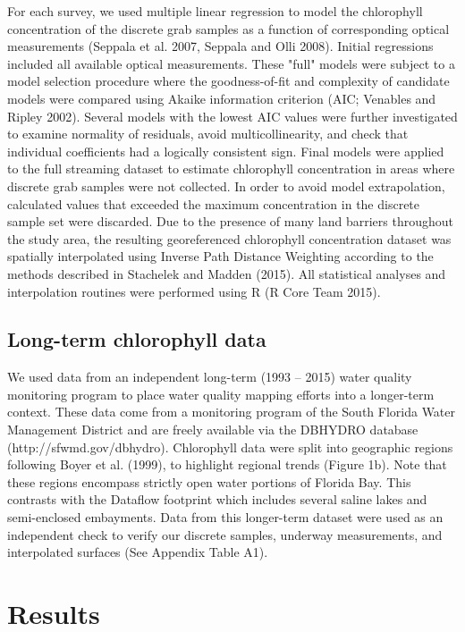 For each survey, we used multiple linear regression to model the chlorophyll concentration of the discrete grab samples as a function of corresponding optical measurements (Seppala et al. 2007, Seppala and Olli 2008). Initial regressions included all available optical measurements. These "full" models were subject to a model selection procedure where the goodness-of-fit and complexity of candidate models were compared using Akaike information criterion (AIC; Venables and Ripley 2002). Several models with the lowest AIC values were further investigated to examine normality of residuals, avoid multicollinearity, and check that individual coefficients had a logically consistent sign. Final models were applied to the full streaming dataset to estimate chlorophyll concentration in areas where discrete grab samples were not collected. In order to avoid model extrapolation, calculated values that exceeded the maximum concentration in the discrete sample set were discarded. Due to the presence of many land barriers throughout the study area, the resulting georeferenced chlorophyll concentration dataset was spatially interpolated using Inverse Path Distance Weighting according to the methods described in Stachelek and Madden (2015). All statistical analyses and interpolation routines were performed using R (R Core Team 2015). 

\subsection{Long-term chlorophyll data}
\label{longtermchl}

We used data from an independent long-term (1993 – 2015) water quality monitoring program to place water quality mapping efforts into a longer-term context. These data come from a monitoring program of the South Florida Water Management District and are freely available via the DBHYDRO database (http://sfwmd.gov/dbhydro). Chlorophyll data were split into geographic regions following Boyer et al. (1999), to highlight regional trends (Figure 1b). Note that these regions encompass strictly open water portions of Florida Bay. This contrasts with the Dataflow footprint which includes several saline lakes and semi-enclosed embayments. Data from this longer-term dataset were used as an independent check to verify our discrete samples, underway measurements, and interpolated surfaces (See Appendix Table A1).

\section{Results}
\label{results}

